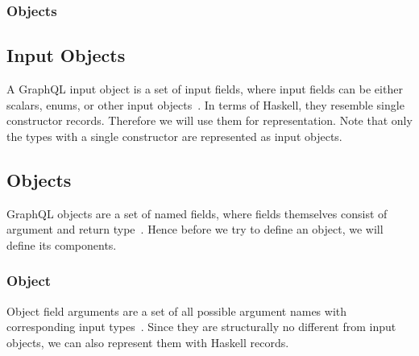 \begin{frame}\frametitle{Objects}

\subsection{Input Objects}

A GraphQL input object is a set of input fields, 
where input fields can be either 
scalars, enums, or other input objects~\cite{gql-spec}. 
In terms of Haskell, they resemble single constructor records. 
Therefore we will use them for representation.  Note that only the types with a single constructor are represented as input objects.


\subsection{Objects}

GraphQL objects are a set of named fields, where fields themselves consist of argument and return type~\cite{gql-spec}. Hence before we try to define an object, we will define its components.

\subsubsection{Object}

Object field arguments are a set of all possible argument names with corresponding input types~\cite{gql-spec}. Since they are structurally no different from input objects, we can also represent them with Haskell records. 





\end{frame}
